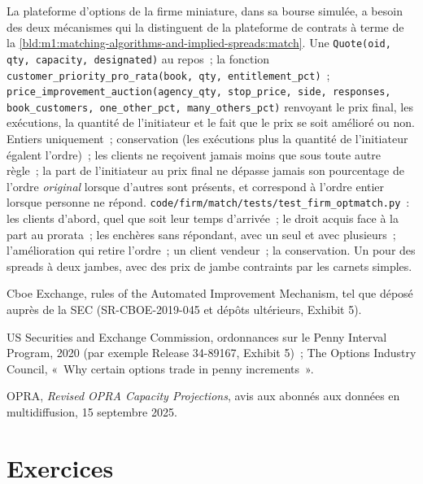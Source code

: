 \begin{build}
 La plateforme d'options de la firme miniature, dans sa bourse simulée, a besoin des deux
mécanismes qui la distinguent de la plateforme de contrats à terme de
la \cref{bld:m1:matching-algorithms-and-implied-spreads:match}.
 Une \texttt{Quote(oid, qty, capacity, designated)} au repos~;
la fonction \texttt{customer\_priority\_pro\_rata(book, qty, entitlement\_pct)}~; \texttt{price\_improvement\_auction(agency\_qty, stop\_price, side, responses,
book\_customers, one\_other\_pct, many\_others\_pct)} renvoyant le prix final,
les exécutions, la quantité de l'initiateur et le fait que le prix se soit amélioré ou non.
 Entiers uniquement~; conservation (les exécutions plus la quantité de
l'initiateur égalent l'ordre)~; les clients ne reçoivent jamais moins que sous toute autre
règle~; la part de l'initiateur au prix final ne dépasse jamais son pourcentage de
l'ordre \emph{original} lorsque d'autres sont présents, et correspond à l'ordre entier lorsque
personne ne répond.
 \texttt{code/firm/match/tests/test\_firm\_optmatch.py}~:
les clients d'abord, quel que soit leur temps d'arrivée~; le droit acquis face à la part
au prorata~; les enchères sans répondant, avec un seul et avec plusieurs~; l'amélioration qui
retire l'ordre~; un client vendeur~; la conservation.
 Un  pour des spreads à deux jambes, avec des prix de
jambe contraints par les carnets simples.
\end{build}

\begin{omsources}
\item Cboe Exchange, rules of the Automated Improvement Mechanism, tel que
déposé auprès de la SEC (SR-CBOE-2019-045 et dépôts ultérieurs, Exhibit 5).
\item US Securities and Exchange Commission, ordonnances sur le Penny Interval
Program, 2020 (par exemple Release 34-89167, Exhibit 5)~; The Options Industry
Council, «~Why certain options trade in penny increments~».
\item OPRA, \emph{Revised OPRA Capacity Projections}, avis aux abonnés aux
données en multidiffusion, 15 septembre 2025.
\end{omsources}

\section{Exercices}

